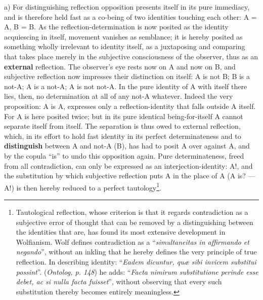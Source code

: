\documentclass[12pt,a4paper,openany]{book}
\newcommand{\opage}[1]{\marginnote{\footnotesize\textit{[#1]}}}
\begin{document}
a) For distinguishing reflection
opposition presents itself in its pure immediacy, and is therefore held fast as a co-being of two identities touching each other: A = A, B = B.
As the reflection-determination is now posited as the identity acquiescing in itself, movement vanishes as semblance; it is hereby posited as something wholly irrelevant to identity itself, as a juxtaposing and comparing that takes place merely in the subjective consciousness of the observer, thus as an \textbf{external} reflection. The observer's eye rests now on A and now on B, and subjective reflection now impresses their distinction on itself: A is not B; B is a not-A; A is a not-A; A is not not-A. In the pure identity of A with itself there lies, then, no determination at all of any not-A whatever. Indeed the very proposition: A is A, expresses only a reflection-identity that falls outside A itself. For A is here posited twice; but in its pure identical being-for-itself A cannot separate itself from itself. The separation is thus owed to external reflection, which, in its effort to hold fast identity in its perfect determinateness and to \textbf{distinguish} between A and not-A (B), has %
\setcounter{footnote}{0}%
\opage{107}had to posit A over against A, and by the copula ``is'' to undo this opposition again. Pure determinateness, freed from all contradiction, can only be expressed as an interjection-identity: A!, and the substitution by which subjective reflection puts A in the place of A (A is? --- A!) is then hereby reduced to a perfect tautology\footnote{Tautological reflection, whose criterion is that it regards contradiction as a subjective error of thought that can be removed by a distinguishing between the identities that are, has found its most extensive development in Wolfianism. Wolf defines contradiction as a ``\textit{simultaneitas in affirmando et negando}'', without an inkling that he hereby defines the very principle of true reflection. In describing identity: ``\textit{Eadem dicuntur, quæ sibi invicem substitui possint}''. (\textit{Ontolog, p. 148}) he adds: ``\textit{Facta nimirum substitutione perinde esse debet, ac si nulla facta fuisset}'', without observing that every such substitution thereby becomes entirely meaningless.}.
\end{document}
